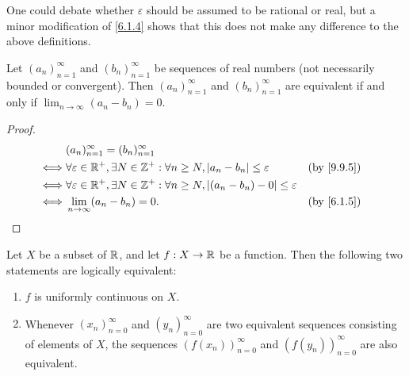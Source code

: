 \begin{rmk}\label{9.9.6}
  One could debate whether \(\varepsilon\) should be assumed to be rational or real, but a minor modification of \cref{6.1.4} shows that this does not make any difference to the above definitions.
\end{rmk}

\begin{lem}\label{9.9.7}
  Let \((a_n)_{n = 1}^\infty\) and \((b_n)_{n = 1}^\infty\) be sequences of real numbers
  (not necessarily bounded or convergent).
  Then \((a_n)_{n = 1}^\infty\) and \((b_n)_{n = 1}^\infty\) are equivalent if and only if \(\lim_{n \to \infty} (a_n - b_n) = 0\).
\end{lem}

\begin{proof}
  \begin{align*}
         & (a_n)_{n = 1}^\infty = (b_n)_{n = 1}^\infty                                                                                 \\
    \iff & \forall \varepsilon \in \R^+, \exists N \in \Z^+ : \forall n \geq N, \abs{a_n - b_n} \leq \varepsilon       &  & \by{9.9.5} \\
    \iff & \forall \varepsilon \in \R^+, \exists N \in \Z^+ : \forall n \geq N, \abs{(a_n - b_n) - 0} \leq \varepsilon                 \\
    \iff & \lim_{n \to \infty} (a_n - b_n) = 0.                                                                        &  & \by{6.1.5}
  \end{align*}
\end{proof}

\begin{prop}\label{9.9.8}
  Let \(X\) be a subset of \(\mathbb{R}\), and let \(f : X \to \mathbb{R}\) be a function.
  Then the following two statements are logically equivalent:
  \begin{enumerate}
    \item \(f\) is uniformly continuous on \(X\).
    \item Whenever \((x_n)_{n = 0}^\infty\) and \((y_n)_{n = 0}^\infty\) are two equivalent sequences consisting of elements of \(X\), the sequences \((f(x_n))_{n = 0}^\infty\) and \((f(y_n))_{n = 0}^\infty\) are also equivalent.
  \end{enumerate}
\end{prop}


